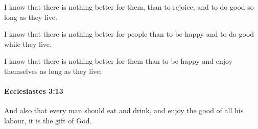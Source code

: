			\begin{versebox}
					\item[BHS] 
					\item[LXX] 
					\item[ASV] I know that there is nothing better for them, than to rejoice, and to do good so long as they live.
					\item[NIV] I know that there is nothing better for people than to be happy and to do good while they live.
					\item[NRSV] I know that there is nothing better for them than to be happy and enjoy themselves as long as they live;
			\end{versebox}

		\paragraph{Ecclesiastes 3:13} %
			\label{ECCLESIASTES-3-13}

			And also that every man should eat and drink, and enjoy the good of all his labour, it is the gift of God.

